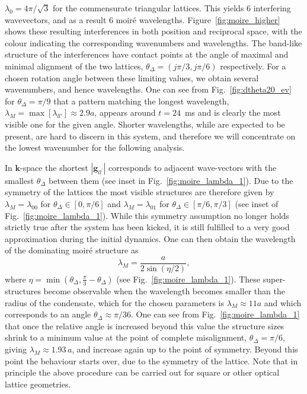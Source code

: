     $\lambda_0 = 4\pi/\sqrt{3}$ for the commensurate triangular lattices. This yields 6 interfering wavevectors, and as a result 6 moir\'e wavelengths. Figure~\ref{fig:moire_higher} shows these resulting interferences in both position and reciprocal space, with the colour indicating the corresponding wavenumbers and wavelengths. The band-like structure of the interferences have contact points at the angle of maximal and minimal alignment of the two lattices, $\theta_\Delta=(j\pi/3,j\pi/6)$ respectively. For a chosen rotation angle between these limiting values, we obtain several wavenumbers, and hence wavelengths. One can see from Fig.~\ref{fig:dtheta20_ev} for $\theta_\Delta = \pi/9$ that a pattern matching the longest wavelength, $\lambda_M= \max[\lambda_{ll'}] \approx 2.9 a$, appears around $t=24$~ms and is clearly the most visible one for the given angle. Shorter wavelengths, while are expected to be present, are hard to discern in this system, and therefore we will concentrate on the lowest wavenumber for the following analysis.

In $\mathbf{k}$-space the shortest $|\mathbf{g}_{ll^\prime}|$ corresponds to adjacent wave-vectors with the smallest $\theta_\Delta$ between them (see inset in Fig.~\ref{fig:moire_lambda_1}). Due to the symmetry of the lattices the most visible structures are therefore given by $\lambda_M=\lambda_{00}$ for $\theta_\Delta\in[0,\pi/6]$ and $\lambda_M=\lambda_{01}$ for $\theta_\Delta\in[\pi/6,\pi/3]$ (see inset of Fig.~\ref{fig:moire_lambda_1}).
While this symmetry assumption no longer holds strictly true after the system has been kicked, it is still fulfilled to a very good approximation during the initial dynamics. One can then obtain the wavelength of the dominating moir\'e structure as~\cite{BIO:Blair_jneur_2007,SS:Yankowitz_natphys_2012}
    	\begin{equation}
    		\lambda_M = \frac{a}{2\sin(\eta/2)},
    		\label{eqn:moire_size}
    	\end{equation}
    where $\eta=\min(\theta_\Delta,\frac{\pi}{3} - \theta_\Delta ) $  (see Fig.~\ref{fig:moire_lambda_1}).
These super-structures become observable when the wavelength becomes smaller than the radius of the condensate, which for the chosen parameters is $\lambda_M \approx 11a$ and which corresponds to an angle $\theta_\Delta \approx \pi/36$.
One can see from Fig.~\ref{fig:moire_lambda_1} that once the relative angle is increased beyond this value the structure sizes shrink to a minimum value at the point of complete misalignment, $\theta_\Delta=\pi/6$, giving $\lambda_M\approx 1.93\,a$, and increase again up to the point of symmetry. Beyond this point the behaviour starts over, due to the symmetry of the lattice. Note that in principle the above procedure can be carried out for square or other optical lattice geometries.

